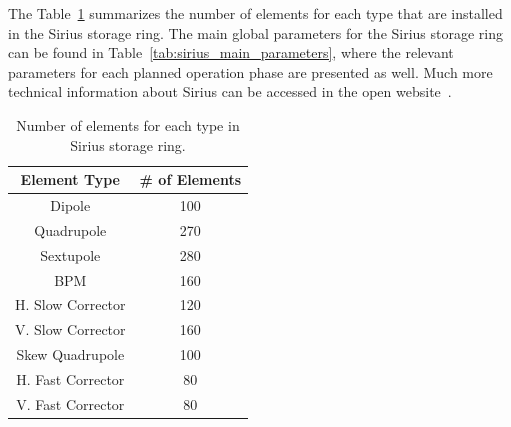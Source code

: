 The Table~\ref{tab:sirius_elements} summarizes the number of elements for each type that are installed in the Sirius storage ring. The main global parameters for the Sirius storage ring can be found in Table~\ref{tab:sirius_main_parameters}, where the relevant parameters for each planned operation phase are presented as well. Much more technical information about Sirius can be accessed in the open website~\cite{wiki}.
\begin{table}
        \centering
        \caption{Number of elements for each type in Sirius storage ring.}
        \label{tab:sirius_elements}
        \begin{tabular}{cc}
            \toprule\toprule
            Element Type & \# of Elements \\
            \hline
            Dipole              & 100 \\
            Quadrupole          & 270 \\
            Sextupole           & 280 \\
            BPM & 160 \\
            H. Slow Corrector & 120 \\
            V. Slow Corrector & 160 \\
            Skew Quadrupole & 100 \\
            H. Fast Corrector & 80 \\
            V. Fast Corrector & 80 \\
            \bottomrule\bottomrule
        \end{tabular}
\end{table}
